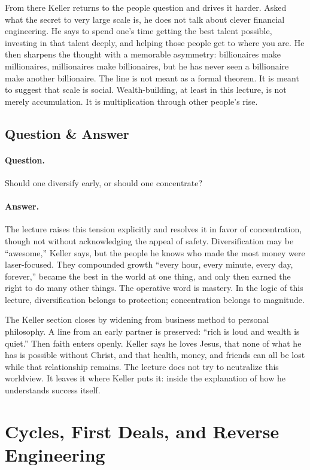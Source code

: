 From there Keller returns to the people question and drives it harder. Asked what the secret to very large scale is, he does not talk about clever financial engineering. He says to spend one's time getting the best talent possible, investing in that talent deeply, and helping those people get to where you are. He then sharpens the thought with a memorable asymmetry: billionaires make millionaires, millionaires make billionaires, but he has never seen a billionaire make another billionaire. The line is not meant as a formal theorem. It is meant to suggest that scale is social. Wealth-building, at least in this lecture, is not merely accumulation. It is multiplication through other people's rise.

\subsection{Question \& Answer}

\paragraph{Question.} Should one diversify early, or should one concentrate?

\paragraph{Answer.} The lecture raises this tension explicitly and resolves it in favor of concentration, though not without acknowledging the appeal of safety. Diversification may be ``awesome,'' Keller says, but the people he knows who made the most money were laser-focused. They compounded growth ``every hour, every minute, every day, forever,'' became the best in the world at one thing, and only then earned the right to do many other things. The operative word is mastery. In the logic of this lecture, diversification belongs to protection; concentration belongs to magnitude.

The Keller section closes by widening from business method to personal philosophy. A line from an early partner is preserved: ``rich is loud and wealth is quiet.'' Then faith enters openly. Keller says he loves Jesus, that none of what he has is possible without Christ, and that health, money, and friends can all be lost while that relationship remains. The lecture does not try to neutralize this worldview. It leaves it where Keller puts it: inside the explanation of how he understands success itself.

\section{Cycles, First Deals, and Reverse Engineering}

